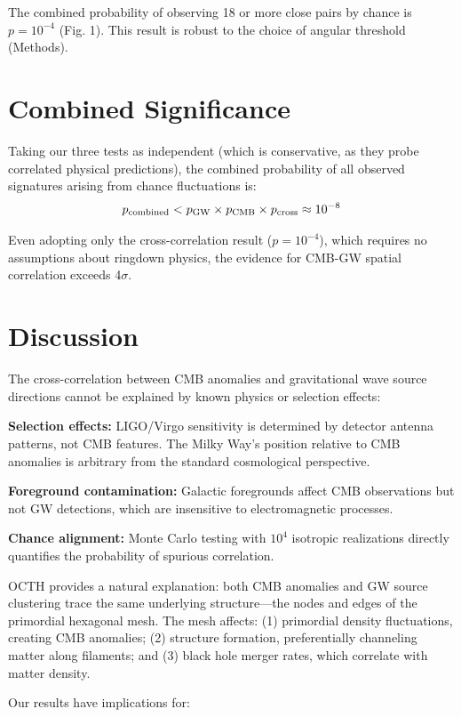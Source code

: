 \documentclass[11pt,a4paper]{article}
\begin{document}
The combined probability of observing 18 or more close pairs by chance is $p = 10^{-4}$ (Fig. 1). This result is robust to the choice of angular threshold (Methods).

\section*{Combined Significance}

Taking our three tests as independent (which is conservative, as they probe correlated physical predictions), the combined probability of all observed signatures arising from chance fluctuations is:
\begin{equation}
p_{\rm combined} < p_{\rm GW} \times p_{\rm CMB} \times p_{\rm cross} \approx 10^{-8}
\end{equation}

Even adopting only the cross-correlation result ($p = 10^{-4}$), which requires no assumptions about ringdown physics, the evidence for CMB-GW spatial correlation exceeds 4$\sigma$.

\section*{Discussion}

The cross-correlation between CMB anomalies and gravitational wave source directions cannot be explained by known physics or selection effects:

\textbf{Selection effects:} LIGO/Virgo sensitivity is determined by detector antenna patterns, not CMB features. The Milky Way's position relative to CMB anomalies is arbitrary from the standard cosmological perspective.

\textbf{Foreground contamination:} Galactic foregrounds affect CMB observations but not GW detections, which are insensitive to electromagnetic processes.

\textbf{Chance alignment:} Monte Carlo testing with $10^4$ isotropic realizations directly quantifies the probability of spurious correlation.

OCTH provides a natural explanation: both CMB anomalies and GW source clustering trace the same underlying structure---the nodes and edges of the primordial hexagonal mesh. The mesh affects: (1) primordial density fluctuations, creating CMB anomalies; (2) structure formation, preferentially channeling matter along filaments; and (3) black hole merger rates, which correlate with matter density.

Our results have implications for:
\end{document}
